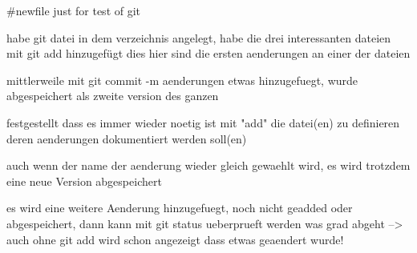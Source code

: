 #newfile just for test of git

habe git datei in dem verzeichnis angelegt,
habe die drei interessanten dateien mit git add hinzugefügt
dies hier sind die ersten aenderungen an einer der dateien

mittlerweile mit git commit -m aenderungen etwas hinzugefuegt, 
wurde abgespeichert als zweite version des ganzen

festgestellt dass es immer wieder noetig ist mit "add"
die datei(en) zu definieren deren aenderungen dokumentiert werden soll(en)

auch wenn der name der aenderung wieder gleich gewaehlt wird,
es wird trotzdem eine neue Version abgespeichert

es wird eine weitere Aenderung hinzugefuegt,
noch nicht geadded oder abgespeichert,
dann kann mit git status ueberprueft werden was grad abgeht
--> auch ohne git add wird schon angezeigt dass etwas geaendert wurde!